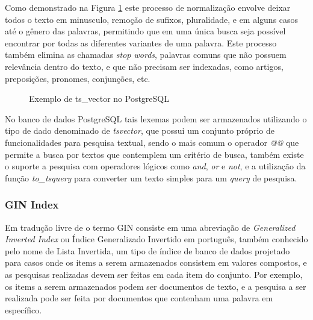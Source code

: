 Como demonstrado na Figura \ref{fig:ts-vector-exemple} este processo de normalização envolve
deixar todos o texto em minusculo, remoção de sufixos, pluralidade, e em alguns casos até o
gênero das palavras, permitindo que em uma única busca seja possível encontrar por todas as
diferentes variantes de uma palavra. Este processo também elimina as chamadas \emph{stop words},
palavras comuns que não possuem relevância dentro do texto, e que não precisam ser indexadas,
como artigos, preposições, pronomes, conjunções, etc.

\begin{figure}[H]
    \caption{Exemplo de ts\_vector no PostgreSQL}
    \centering
    \label{fig:ts-vector-exemple}
\end{figure}

No banco de dados PostgreSQL tais lexemas podem ser armazenados utilizando o tipo de
dado denominado de \emph{tsvector}, que possui um conjunto próprio de funcionalidades
para pesquisa textual, sendo o mais comum o operador \emph{@@} que permite a busca por textos
que contemplem um critério de busca, também existe o suporte a pesquisa com operadores lógicos
como \emph{and}, \emph{or} e \emph{not}, e a utilização da função \emph{to\_tsquery} para
converter um texto simples para um \emph{query} de pesquisa.

\subsubsection{GIN Index}

Em tradução livre de \cite{2022:PostgreSQL} o termo GIN consiste em uma
abreviação de \emph{Generalized Inverted Index} ou Índice Generalizado Invertido em
português, também conhecido pelo nome de Lista Invertida, um tipo de índice de banco
de dados projetado para casos onde os items a serem armazenados consistem em valores
compostos, e as pesquisas realizadas devem ser feitas em cada item do conjunto.
Por exemplo, os items a serem armazenados podem ser documentos de texto, e a pesquisa
a ser realizada pode ser feita por documentos que contenham uma palavra em específico.

